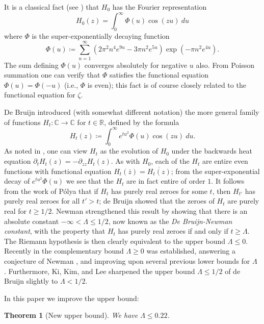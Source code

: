\documentclass[a4paper,11pt,twoside]{amsart}
\newtheorem{theorem}{Theorem}[section]
\newcommand\R{\mathbb{R}}
\newcommand\C{\mathbb{C}}
\begin{document}
It is a classical fact (see \cite[p. 255]{titch}) that $H_0$ has the Fourier representation
$$ H_0(z) = \int_0^\infty \Phi(u) \cos(zu)\ du$$
where $\Phi$ is the super-exponentially decaying function
\begin{equation}\label{phidef}
 \Phi(u) \coloneqq \sum_{n=1}^\infty (2\pi^2  n^4 e^{9u} - 3\pi n^2 e^{5u} ) \exp(-\pi n^2 e^{4u} ).
\end{equation}
The sum defining $\Phi(u)$ converges absolutely for negative $u$ also.  From Poisson summation one can verify that $\Phi$ satisfies the functional equation $\Phi(u) = \Phi(-u)$ (i.e., $\Phi$ is even); this fact is of course closely related to the functional equation for $\zeta$. 

De Bruijn \cite{debr} introduced (with somewhat different notation) the more general family of functions $H_t \colon \C \to \C$ for $t \in \R$, defined by the formula
\begin{equation}\label{htdef}
 H_t(z) \coloneqq \int_0^\infty e^{tu^2} \Phi(u) \cos(zu)\ du.
\end{equation}
As noted in \cite[p.114]{csv}, one can view $H_t$ as the evolution of $H_0$ under the backwards heat equation $\partial_t H_t(z)= -\partial_{zz} H_t(z)$.
As with $H_0$, each of the $H_t$ are entire even functions with functional equation $H_t(\overline{z}) = \overline{H_t(z)}$; from the super-exponential decay of $e^{tu^2} \Phi(u)$ we see that the $H_t$ are in fact entire of order $1$.  It follows from the work of P\'olya \cite{polya} that if $H_t$ has purely real zeroes for some $t$, then $H_{t'}$ has purely real zeroes for all $t'>t$; de Bruijn showed that the zeroes of $H_t$ are purely real for $t \geq 1/2$.  Newman \cite{newman} strengthened this result by showing that there is an absolute constant $-\infty < \Lambda \leq 1/2$, now known as the \emph{De Bruijn-Newman constant}, with the property that $H_t$ has purely real zeroes if and only if $t \geq \Lambda$.  The Riemann hypothesis is then clearly equivalent to the upper bound $\Lambda \leq 0$.  Recently in \cite{brad} the complementary bound $\Lambda \geq 0$ was established, answering a conjecture of Newman \cite{newman}, and improving upon several previous lower bounds for $\Lambda$ \cite{cnv,nrv,crv,cosv,odlyzko,saouter}.  Furthermore, Ki, Kim, and Lee \cite{kkl} sharpened the upper bound $\Lambda \leq 1/2$ of de Bruijn \cite{debr} slightly to $\Lambda < 1/2$.  

In this paper we improve the upper bound:

\begin{theorem}[New upper bound]\label{new-upper}  We have $\Lambda \leq 0.22$.
\end{theorem}
\end{document}
